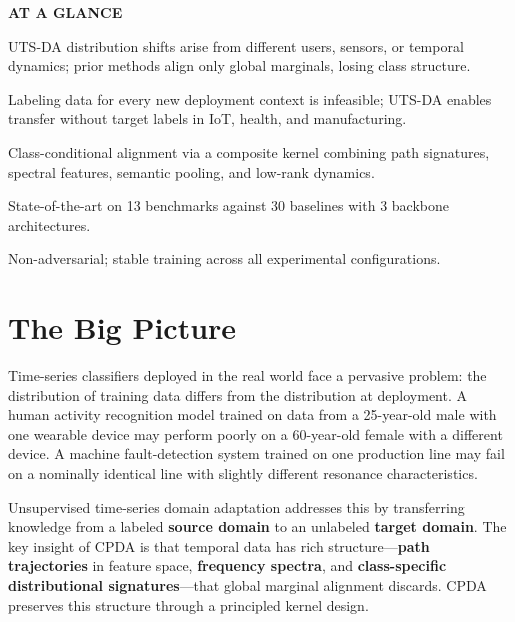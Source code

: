 \documentclass[10pt,twocolumn]{article}
\begin{document}
\begin{mdframed}[backgroundcolor=boxgray,linecolor=rulered,linewidth=1pt,
    innerleftmargin=6pt,innerrightmargin=6pt,
    innertopmargin=6pt,innerbottommargin=6pt]
\textbf{\small AT A GLANCE}\par\vspace{4pt}
\begin{description}[leftmargin=0pt,labelsep=4pt,itemsep=2pt,parsep=0pt,
    font=\small\bfseries]
  \item[Problem:] UTS-DA distribution shifts arise from different users, sensors,
    or temporal dynamics; prior methods align only global marginals, losing class
    structure.
  \item[Why it matters:] Labeling data for every new deployment context is
    infeasible; UTS-DA enables transfer without target labels in IoT, health,
    and manufacturing.
  \item[Method:] Class-conditional alignment via a composite kernel combining
    path signatures, spectral features, semantic pooling, and low-rank dynamics.
  \item[Result:] State-of-the-art on 13 benchmarks against 30 baselines with
    3 backbone architectures.
  \item[Evidence:] Non-adversarial; stable training across all experimental
    configurations.
\end{description}
\end{mdframed}

\section{The Big Picture}

Time-series classifiers deployed in the real world face a pervasive problem:
the distribution of training data differs from the distribution at deployment.
A human activity recognition model trained on data from a 25-year-old male with
one wearable device may perform poorly on a 60-year-old female with a different
device. A machine fault-detection system trained on one production line may fail
on a nominally identical line with slightly different resonance characteristics.

Unsupervised time-series domain adaptation addresses this by transferring knowledge
from a labeled \textbf{source domain} to an unlabeled \textbf{target domain}.
The key insight of CPDA is that temporal data has rich structure---\textbf{path
trajectories} in feature space, \textbf{frequency spectra}, and \textbf{class-specific
distributional signatures}---that global marginal alignment discards. CPDA preserves
this structure through a principled kernel design.
\end{document}
